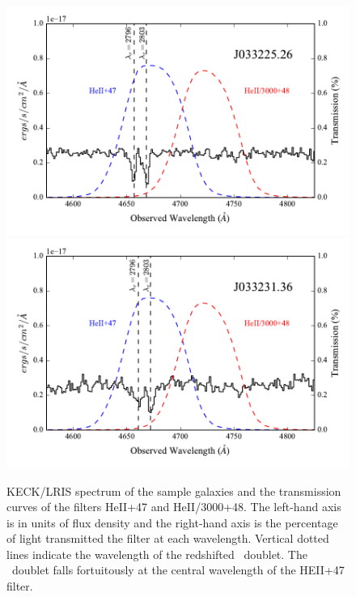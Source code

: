 \documentclass[twocolumn]{aastex61}
\begin{document}
\begin{figure}[!htb]
\includegraphics[scale=0.58]{../Figures/filt_26_spectra.pdf}
\includegraphics[scale=0.58]{../Figures/filt_36_spectra.pdf}
\caption{KECK/LRIS spectrum of the sample galaxies and the transmission curves of the filters HeII+47 and HeII/3000+48. The left-hand axis is in units of flux density and the right-hand axis is the percentage of light transmitted the filter at each wavelength. Vertical dotted lines indicate the wavelength of the redshifted \ doublet. The \ doublet falls fortuitously at the central wavelength of the HEII+47 filter.}
\label{fig:spec_images}
\end{figure}
\end{document}
